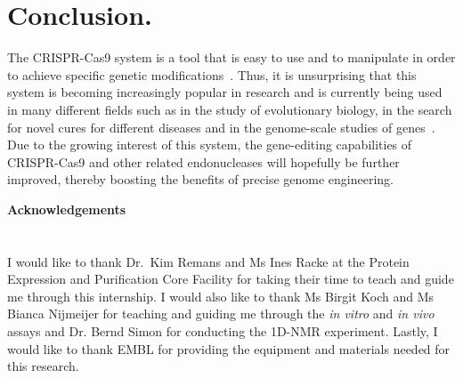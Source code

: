 \documentclass[11pt]{article}
\begin{document}
\section{Conclusion.}
The CRISPR-Cas9 system is a tool that is easy to use and to manipulate in order to achieve specific genetic modifications~\citep{Kaur2015, Sternberg2015}. Thus, it is unsurprising that this system is becoming increasingly popular in research and is currently being used in many different fields such as in the study of evolutionary biology, in the search for novel cures for different diseases and in the genome-scale studies of genes~\citep{Gilbert2014, Kaminski2016, Pal2014}. Due to the growing interest of this system, the gene-editing capabilities of CRISPR-Cas9 and other related endonucleases will hopefully be further improved, thereby boosting the benefits of precise genome engineering.

\newpage 
\vspace*{\fill}
{\huge\bfseries Acknowledgements} \\
\\
\\
\large{I would like to thank Dr.~Kim Remans and Ms Ines Racke at the Protein Expression and Purification Core Facility for taking their time to teach and guide me through this internship. I would also like to thank Ms Birgit Koch and Ms Bianca Nijmeijer for teaching and guiding me through the \textit{in vitro} and \textit{in vivo} assays and Dr. Bernd Simon for conducting the 1D-NMR experiment. Lastly, I would like to thank EMBL for providing the equipment and materials needed for this research.}
\vfill

\newpage


\end{document}
